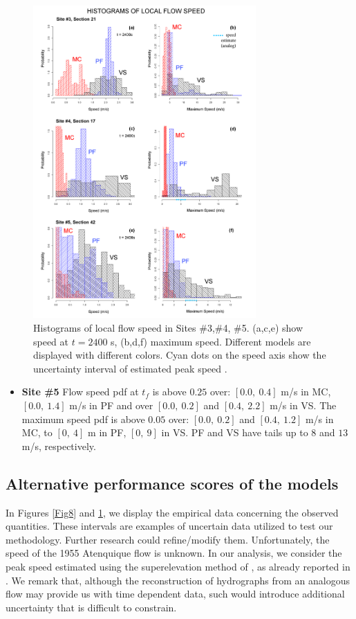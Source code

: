 \documentclass[nhess, manuscript]{copernicus}
\begin{document}
\begin{figure}[H]
\centering
\includegraphics[width=0.76\textwidth]{Fig9.png}
\caption{Histograms of local flow speed in Sites \#3,\#4, \#5. (a,c,e) show speed at $t=2400$ s, (b,d,f) maximum speed. Different models are displayed with different colors. Cyan dots on the speed axis show the uncertainty interval of estimated peak speed \cite{Pierson1985}.}
\label{Fig9}
\end{figure}

\begin{itemize}
\item\textbf{Site \#5} Flow speed pdf at $t_f$ is above $0.25$ over: $[0.0,\ 0.4]$ m/s in MC, $[0.0,\ 1.4]$ m/s in PF and over $[0.0,\ 0.2]$ and $[0.4,\ 2.2]$  m/s in VS. The maximum speed pdf is above $0.05$ over: $[0.0,\ 0.2]$ and $[0.4,\ 1.2]$ m/s in MC, to $[0,\ 4]$ m in PF, $[0,\ 9]$ in VS. PF and VS have tails up to $8$ and $13$ m/s, respectively.
\end{itemize}

\subsection{Alternative performance scores of the models}
In  Figures \ref{Fig8} and \ref{Fig9}, we display the empirical data concerning the observed quantities. These intervals are examples of uncertain data utilized to test our methodology. Further research could refine/modify them. Unfortunately, the speed of the 1955 Atenquique flow is unknown. In our analysis, we consider the peak speed estimated using the superelevation method of \cite{Pierson1985}, as already reported in \cite{Saucedo2008}. We remark that, although the reconstruction of hydrographs from an analogous flow may provide us with time dependent data, such would introduce additional uncertainty that is difficult to constrain.
\end{document}
